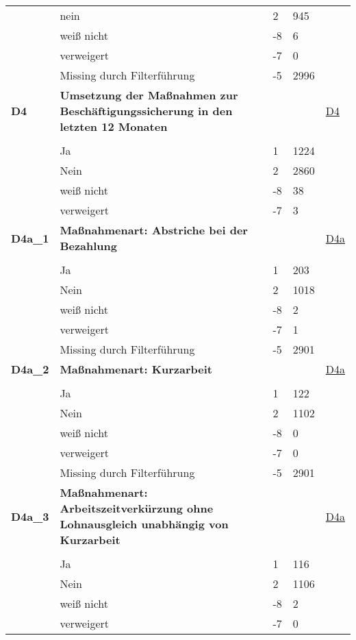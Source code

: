 \begin{longtable}{| L{2.5cm} | L{8.25cm}| C{1.5cm} | R{1.25cm} | C{2.25cm} |  }
   & nein & 2 & 945 &  \\ 
   & weiß nicht & -8 & 6 &  \\ 
   & verweigert & -7 & 0 &  \\ 
   & Missing durch Filterführung & -5 & 2996 &  \\ 
   \midrule
\textbf{D4}\label{var:suf:D4} & \textbf{Umsetzung der Maßnahmen zur Beschäftigungssicherung in den letzten 12 Monaten} &  &  & \hyperref[D4]{D4} \\ 
   &  &  &  &  \\ 
   & Ja & 1 & 1224 &  \\ 
   & Nein & 2 & 2860 &  \\ 
   & weiß nicht & -8 & 38 &  \\ 
   & verweigert & -7 & 3 &  \\ 
   \midrule
\textbf{D4a\_1}\label{var:suf:D4a:1} & \textbf{Maßnahmenart: Abstriche bei der Bezahlung} &  &  & \hyperref[D4a]{D4a} \\ 
   &  &  &  &  \\ 
   & Ja & 1 & 203 &  \\ 
   & Nein & 2 & 1018 &  \\ 
   & weiß nicht & -8 & 2 &  \\ 
   & verweigert & -7 & 1 &  \\ 
   & Missing durch Filterführung & -5 & 2901 &  \\ 
   \midrule
\textbf{D4a\_2}\label{var:suf:D4a:2} & \textbf{Maßnahmenart: Kurzarbeit} &  &  & \hyperref[D4a]{D4a} \\ 
   &  &  &  &  \\ 
   & Ja & 1 & 122 &  \\ 
   & Nein & 2 & 1102 &  \\ 
   & weiß nicht & -8 & 0 &  \\ 
   & verweigert & -7 & 0 &  \\ 
   & Missing durch Filterführung & -5 & 2901 &  \\ 
   \midrule
\textbf{D4a\_3}\label{var:suf:D4a:3} & \textbf{Maßnahmenart: Arbeitszeitverkürzung ohne Lohnausgleich unabhängig von Kurzarbeit} &  &  & \hyperref[D4a]{D4a} \\ 
   &  &  &  &  \\ 
   & Ja & 1 & 116 &  \\ 
   & Nein & 2 & 1106 &  \\ 
   & weiß nicht & -8 & 2 &  \\ 
   & verweigert & -7 & 0 &  \\ 

\end{longtable}
